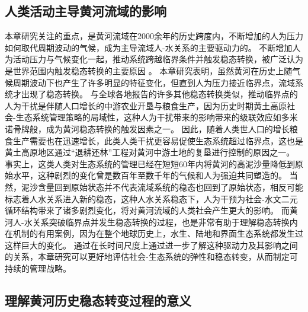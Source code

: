 
\subsection{人类活动主导黄河流域的影响}\label{ch3:sec:human-activity}

本章研究关注的重点，是黄河流域在2000余年的历史跨度内，不断增加的人为压力如何取代周期波动的气候，成为主导流域人-水关系的主要驱动力的。
不断增加人为活动压力与气候变化一起，推动系统跨越临界条件并触发稳态转换，被广泛认为是世界范围内触发稳态转换的主要原因 \cite{scheffer2001,scheffer2003}。
本章研究表明，虽然黄河在历史上随气候周期波动下也产生了许多明显的特征变化，但直到人为压力接近临界点，流域系统才出现了稳态转换。
与全球各地报告的许多其他稳态转换类似，推动临界点的人为干扰是伴随人口增长的中游农业开垦与粮食生产，因为历史时期黄土高原社会-生态系统管理策略的局域性，这种人为干扰带来的影响带来的级联效应如多米诺骨牌般，成为黄河稳态转换的触发因素之一\cite{rocha2018}。
因此，随着人类世人口的增长粮食生产需要也在迅速增长，此类人类干扰更容易促使生态系统超过临界点，这也是黄土高原地区通过“退耕还林”工程对黄河中游土地的复垦进行控制的原因之一。
事实上，这类人类对生态系统的管理已经在短短60年内将黄河的高泥沙量降低到原始水平，这种剧烈的变化曾是数百年至数千年的气候和人为强迫共同塑造的\cite{wang2016e, ji2018}。
当然，泥沙含量回到原始状态并不代表流域系统的稳态也回到了原始状态，相反可能标志着人水关系进入新的稳态，这种人水关系稳态下，人为干预为社会-水文二元循环结构带来了诸多剧烈变化，将对黄河流域的人类社会产生更大的影响。
而黄河人-水关系突破临界点并发生稳态转换的过程，也是非常有助于理解稳态转换内在机制的有用案例，因为在整个地球历史上，水生、陆地和界面生态系统都发生过这样巨大的变化\cite{hughes2013, rocha2018}。
通过在长时间尺度上通过进一步了解这种驱动力及其影响之间的关系，本章研究可以更好地评估社会-生态系统的弹性和稳态转变，从而制定可持续的管理战略\cite{scheffer2003}。

\subsection{理解黄河历史稳态转变过程的意义}

